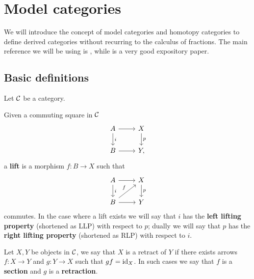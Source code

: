 \chapter{Model categories}

We will introduce the concept of model categories and homotopy categories to define derived categories without recurring to the calculus of fractions. The main reference we will be using is \cite{dwyer1995homotopy}, while \cite{hovey2007model} is a very good expository paper.

\section{Basic definitions}
Let $\mathcal{C}$ be a category.

\begin{definition}[Lift]
    Given a commuting square in $\mathcal{C}$
    \[\begin{tikzcd}
	    A & X \\
	    B & {Y,}
	    \arrow[from=1-1, to=1-2]
	    \arrow["i", from=1-1, to=2-1]
	    \arrow["p", from=1-2, to=2-2]
	    \arrow[from=2-1, to=2-2]
    \end{tikzcd}\]
    a \textbf{lift} is a morphism $f\colon B \longrightarrow X$ such that
    \[\begin{tikzcd}
	    A & X \\
	    B & Y
	    \arrow[from=1-1, to=1-2]
	    \arrow["i", from=1-1, to=2-1]
	    \arrow["p", from=1-2, to=2-2]
	    \arrow["f", from=2-1, to=1-2]
	    \arrow[from=2-1, to=2-2]
    \end{tikzcd}\]
    commutes. In the case where a lift exists we will say that $i$ has the \textbf{left lifting property} (shortened as LLP) with respect to $p$; dually we will say that $p$ has the \textbf{right lifting property} (shortened as RLP) with respect to $i$.

\end{definition}


\begin{definition}[Retract]
    Let $X,Y$ be objects in $\mathcal{C}$, we say that $X$ is a retract of $Y$ if there exists arrows $f\colon X \longrightarrow Y$ and $g \colon Y \longrightarrow X$ such that $gf = \mathrm{id}_X$. In such cases we say that $f$ is a \textbf{section} and $g$ is a \textbf{retraction}.  
\end{definition}


